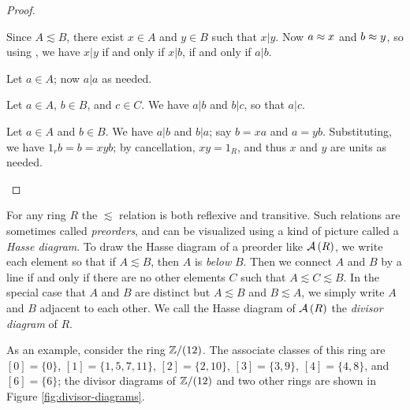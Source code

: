 \begin{proof}
\begin{inlineproplist}
\item Since \(A \lesssim B\), there exist \(x \in A\) and \(y \in B\) such that \(x|y\). Now \(a \approx x\) and \(b \approx y\), so using , we have \(x|y\) if and only if \(x|b\), if and only if \(a|b\).
\item Let \(a \in A\); now \(a|a\) as needed.
\item Let \(a \in A\), \(b \in B\), and \(c \in C\). We have \(a|b\) and \(b|c\), so that \(a|c\).
\item Let \(a \in A\) and \(b \in B\). We have \(a|b\) and \(b|a\); say \(b = xa\) and \(a = yb\). Substituting, we have \(1_rb = b = xyb\); by cancellation, \(xy = 1_R\), and thus \(x\) and \(y\) are units as needed.
\end{inlineproplist}
\end{proof}

For any ring \(R\) the \(\lesssim\) relation is both reflexive and transitive. Such relations are sometimes called \emph{preorders}, and can be visualized using a kind of picture called a  \emph{Hasse diagram}. To draw the Hasse diagram of a preorder like \( \mathcal{A}\left(R\right) \), we write each element so that if \(A \lesssim B\), then \(A\) is \emph{below} \(B\). Then we connect \(A\) and \(B\) by a line if and only if there are no other elements \(C\) such that \(A \lesssim C \lesssim B\). In the special case that \(A\) and \(B\) are distinct but \(A \lesssim B\) and \(B \lesssim A\), we simply write \(A\) and \(B\) adjacent to each other. We call the Hasse diagram of \( \mathcal{A}\left(R\right) \) the \emph{divisor diagram}  of \(R\).

As an example, consider the ring \(\mathbb{Z}/(12)\). The associate classes of this ring are \([0] = \{0\}\), \([1] = \{1,5,7,11\}\), \([2] = \{2,10\}\), \([3] = \{3,9\}\), \([4] = \{4,8\}\), and \([6] = \{6\}\); the divisor diagrams of \(\mathbb{Z}/(12)\) and two other rings are shown in Figure \ref{fig:divisor-diagrams}.

